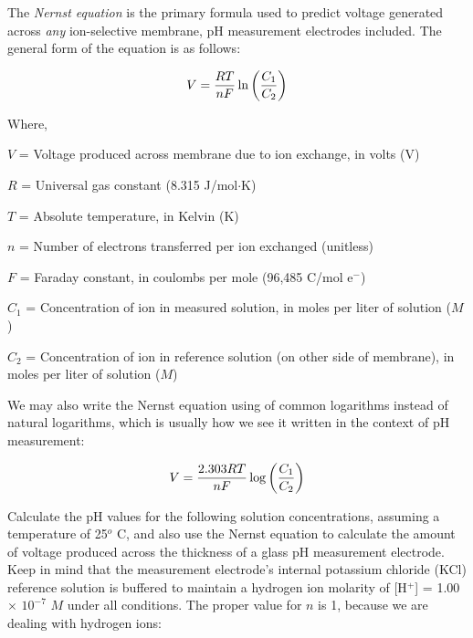 

The {\it Nernst equation} is the primary formula used to predict voltage generated across {\it any} ion-selective membrane, pH measurement electrodes included.  The general form of the equation is as follows:

$$V = {{R T} \over {nF}} \ln \left({C_1 \over C_2}\right)$$

\noindent
Where,

$V$ = Voltage produced across membrane due to ion exchange, in volts (V)

$R$ = Universal gas constant (8.315 J/mol$\cdot$K)

$T$ = Absolute temperature, in Kelvin (K)

$n$ = Number of electrons transferred per ion exchanged (unitless)

$F$ = Faraday constant, in coulombs per mole (96,485 C/mol e$^{-}$)

$C_1$ = Concentration of ion in measured solution, in moles per liter of solution ($M$)

$C_2$ = Concentration of ion in reference solution (on other side of membrane), in moles per liter of solution ($M$)

\vskip 10pt

We may also write the Nernst equation using of common logarithms instead of natural logarithms, which is usually how we see it written in the context of pH measurement:

$$V = {{2.303 R T} \over {nF}} \log \left({C_1 \over C_2}\right)$$

Calculate the pH values for the following solution concentrations, assuming a temperature of 25$^{o}$ C, and also use the Nernst equation to calculate the amount of voltage produced across the thickness of a glass pH measurement electrode.  Keep in mind that the measurement electrode's internal potassium chloride (KCl) reference solution is buffered to maintain a hydrogen ion molarity of [H$^{+}$] = 1.00 $\times$ $10^{-7}$ $M$ under all conditions.  The proper value for $n$ is 1, because we are dealing with hydrogen ions:



